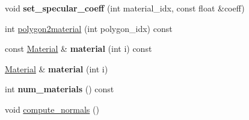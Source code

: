 \begin{DoxyCompactItemize}
\item 
\hypertarget{classMesh_a470c8fb2872fc583645ef0bfa44747ee}{void {\bfseries set\-\_\-specular\-\_\-coeff} (int material\-\_\-idx, const float \&coeff)}\label{classMesh_a470c8fb2872fc583645ef0bfa44747ee}

\item 
int \hyperlink{classMesh_a4c2ab09440340626a29be1d7902a7758}{polygon2material} (int polygon\-\_\-idx) const 
\item 
\hypertarget{classMesh_aa23b95044b1637d63c7398a2fdcd6eb2}{const \hyperlink{classMaterial}{Material} \& {\bfseries material} (int i) const }\label{classMesh_aa23b95044b1637d63c7398a2fdcd6eb2}

\item 
\hypertarget{classMesh_a0d508965e0a0cb8f3b197f4bce580d71}{\hyperlink{classMaterial}{Material} \& {\bfseries material} (int i)}\label{classMesh_a0d508965e0a0cb8f3b197f4bce580d71}

\item 
\hypertarget{classMesh_aa7ec7c54c2193d3570319e533c2b4bd6}{int {\bfseries num\-\_\-materials} () const }\label{classMesh_aa7ec7c54c2193d3570319e533c2b4bd6}

\item 
void \hyperlink{classMesh_a4e9bedfc415b7135c9587f63535fcb6d}{compute\-\_\-normals} ()
\end{DoxyCompactItemize}


